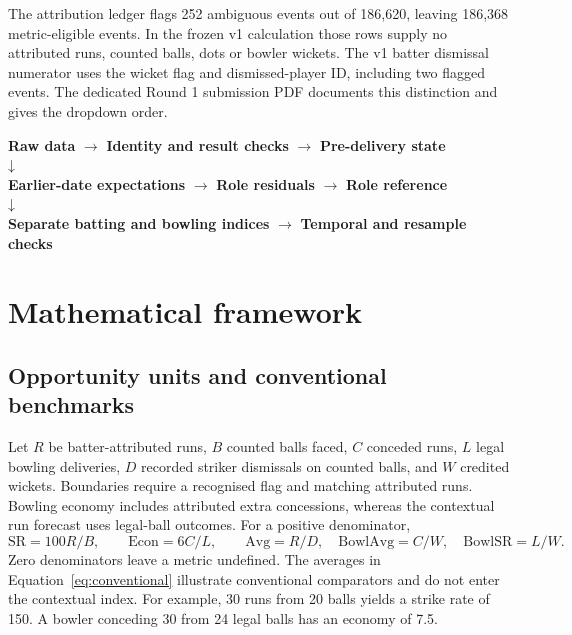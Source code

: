 \documentclass[12pt,a4paper]{article}
\begin{document}
The attribution ledger flags 252 ambiguous events out of 186,620, leaving 186,368 metric-eligible events. In the frozen v1 calculation those rows supply no attributed runs, counted balls, dots or bowler wickets. The v1 batter dismissal numerator uses the wicket flag and dismissed-player ID, including two flagged events. The dedicated Round 1 submission PDF documents this distinction and gives the dropdown order.

\begin{center}\begin{minipage}{\linewidth}\centering
\textbf{Raw data} $\longrightarrow$ \textbf{Identity and result checks} $\longrightarrow$ \textbf{Pre-delivery state}\\[3pt]
$\mathord{\downarrow}$\\[3pt]
\textbf{Earlier-date expectations} $\longrightarrow$ \textbf{Role residuals} $\longrightarrow$ \textbf{Role reference}\\[3pt]
$\mathord{\downarrow}$\\[3pt]
\textbf{Separate batting and bowling indices} $\longrightarrow$ \textbf{Temporal and resample checks}
\end{minipage}\end{center}

\section{Mathematical framework}
\subsection{Opportunity units and conventional benchmarks}
Let $R$ be batter-attributed runs, $B$ counted balls faced, $C$ conceded runs, $L$ legal bowling deliveries, $D$ recorded striker dismissals on counted balls, and $W$ credited wickets. Boundaries require a recognised flag and matching attributed runs. Bowling economy includes attributed extra concessions, whereas the contextual run forecast uses legal-ball outcomes. For a positive denominator,
\begin{equation}
\mathrm{SR}=100R/B,\qquad\mathrm{Econ}=6C/L,\qquad
\mathrm{Avg}=R/D,\quad\mathrm{BowlAvg}=C/W,\quad\mathrm{BowlSR}=L/W.
\label{eq:conventional}
\end{equation}
Zero denominators leave a metric undefined. The averages in Equation~\ref{eq:conventional} illustrate conventional comparators and do not enter the contextual index. For example, 30 runs from 20 balls yields a strike rate of 150. A bowler conceding 30 from 24 legal balls has an economy of 7.5.
\end{document}
